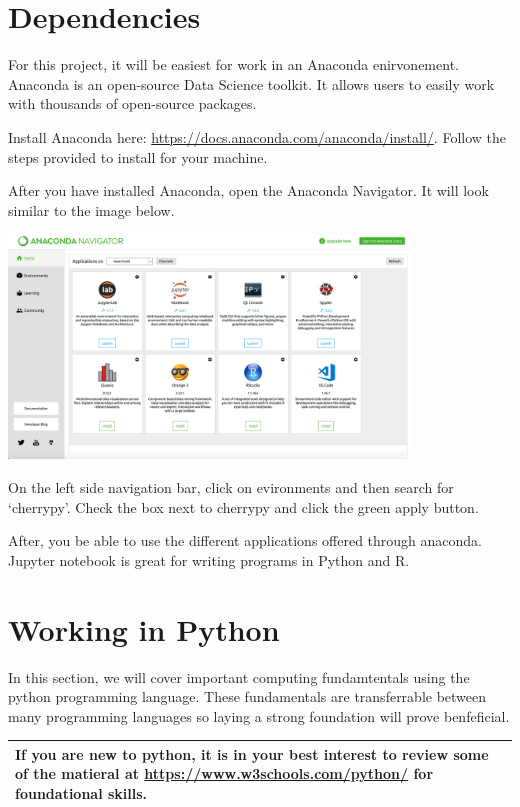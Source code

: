\documentclass[]{book}
\begin{document}
\chapter{Dependencies}\label{dependencies}

For this project, it will be easiest for work in an Anaconda
enirvonement. Anaconda is an open-source Data Science toolkit. It allows
users to easily work with thousands of open-source packages.

Install Anaconda here:
\url{https://docs.anaconda.com/anaconda/install/}. Follow the steps
provided to install for your machine.

After you have installed Anaconda, open the Anaconda Navigator. It will
look similar to the image below.

\includegraphics[width=0.80000\textwidth]{images/anacondanav.png}

On the left side navigation bar, click on evironments and then search
for `cherrypy'. Check the box next to cherrypy and click the green apply
button.

After, you be able to use the different applications offered through
anaconda. Jupyter notebook is great for writing programs in Python and
R.

\chapter{Working in Python}\label{working-in-python}

In this section, we will cover important computing fundamtentals using
the python programming language. These fundamentals are transferrable
between many programming languages so laying a strong foundation will
prove benfeficial.

\begin{longtable}[]{@{}l@{}}
\toprule
If you are new to python, it is in your best interest to review some of
the matieral at \url{https://www.w3schools.com/python/} for foundational
skills.\tabularnewline
\bottomrule
\end{longtable}
\end{document}

